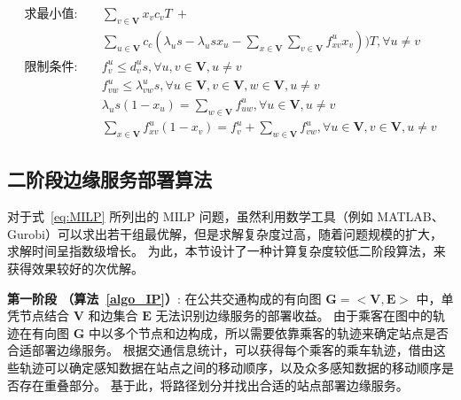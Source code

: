 \begin{equation}
\begin{aligned}
求最小值: &\quad \sum_{v\in \boldsymbol{V}}x_v c_vT \ + \\&\quad \sum_{u\in \boldsymbol{V}}c_c(\lambda_u s -  \lambda_u s x_u - \sum_{x\in \boldsymbol{V}}\sum_{v\in \boldsymbol{V}}f^u_{xv} x_v ))T, \forall u \neq v\\
\text{限制条件:} &\quad  f^u_v \leq d^u_v s, \forall u, v\in \boldsymbol{V}, u\neq v\\
&\quad f^u_{vw} \leq \lambda^u_{vw} s, \forall u \in \boldsymbol{V}, v \in \boldsymbol{V}, w \in \boldsymbol{V}, u \neq v\\
&\quad \lambda_u s (1 - x_u) = \sum_{w\in \boldsymbol{V}}f^u_{uw}, \forall u\in \boldsymbol{V}, u \neq v\\
&\quad \sum_{x\in \boldsymbol{V}}f^u_{xv} (1-x_v) = f^u_v + \sum_{w\in \boldsymbol{V}}f^u_{vw}, \forall u\in \boldsymbol{V}, v\in \boldsymbol{V},u \neq v
\end{aligned}
\label{eq:MILP}
\end{equation}

\subsection{二阶段边缘服务部署算法}

对于式~\eqref{eq:MILP} 所列出的 MILP 问题，虽然利用数学工具（例如 MATLAB、Gurobi）可以求出若干组最优解，但是求解复杂度过高，随着问题规模的扩大，求解时间呈指数级增长。
为此，本节设计了一种计算复杂度较低二阶段算法，来获得效果较好的次优解。

\textbf{第一阶段 （算法~\ref{algo_IP}）}:
在公共交通构成的有向图 $\boldsymbol{G}=<\boldsymbol{V}, \boldsymbol{E}>$ 中，单凭节点结合 $\boldsymbol{V}$ 和边集合 $\boldsymbol{E}$ 无法识别边缘服务的部署收益。
由于乘客在图中的轨迹在有向图 $\boldsymbol{G}$ 中以多个节点和边构成，所以需要依靠乘客的轨迹来确定站点是否合适部署边缘服务。
根据交通信息统计，可以获得每个乘客的乘车轨迹，借由这些轨迹可以确定感知数据在站点之间的移动顺序，以及众多感知数据的移动顺序是否存在重叠部分。
基于此，将路径划分并找出合适的站点部署边缘服务。

